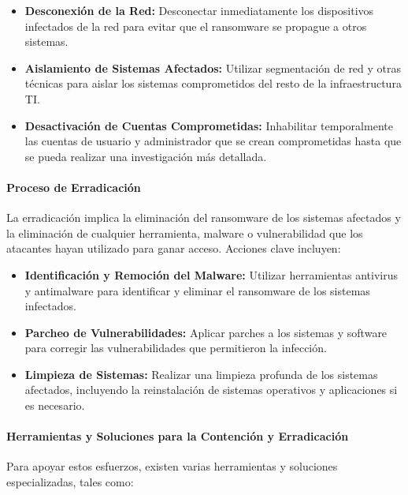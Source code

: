 \begin{itemize}
    \item \textbf{Desconexión de la Red:} Desconectar inmediatamente los dispositivos infectados de la red para evitar que el ransomware se propague a otros sistemas.
    \item \textbf{Aislamiento de Sistemas Afectados:} Utilizar segmentación de red y otras técnicas para aislar los sistemas comprometidos del resto de la infraestructura TI.
    \item \textbf{Desactivación de Cuentas Comprometidas:} Inhabilitar temporalmente las cuentas de usuario y administrador que se crean comprometidas hasta que se pueda realizar una investigación más detallada.
\end{itemize}

\paragraph{Proceso de Erradicación}

La erradicación implica la eliminación del ransomware de los sistemas afectados y la eliminación de cualquier herramienta, malware o vulnerabilidad que los atacantes hayan utilizado para ganar acceso. Acciones clave incluyen:

\begin{itemize}
    \item \textbf{Identificación y Remoción del Malware:} Utilizar herramientas antivirus y antimalware para identificar y eliminar el ransomware de los sistemas infectados.
    \item \textbf{Parcheo de Vulnerabilidades:} Aplicar parches a los sistemas y software para corregir las vulnerabilidades que permitieron la infección.
    \item \textbf{Limpieza de Sistemas:} Realizar una limpieza profunda de los sistemas afectados, incluyendo la reinstalación de sistemas operativos y aplicaciones si es necesario.
\end{itemize}

\paragraph{Herramientas y Soluciones para la Contención y Erradicación}

Para apoyar estos esfuerzos, existen varias herramientas y soluciones especializadas, tales como:

